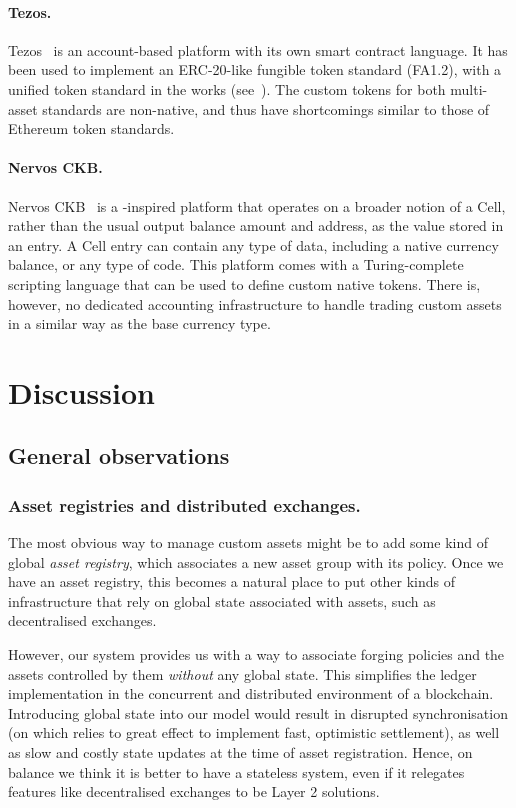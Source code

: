 \paragraph{Tezos.}

Tezos~\cite{tezos} is an account-based platform with its own smart contract language.
It has been used to implement an ERC-20-like fungible token standard (FA1.2),
with a unified token standard in the works (see~\cite{tezosMA}).
The custom tokens for both multi-asset standards are non-native, and thus have shortcomings
similar to those of Ethereum token standards.


\paragraph{Nervos CKB.}

Nervos CKB~\cite{nervos} is a \UTXO{}-inspired platform that operates on a broader notion of a Cell,
rather than the usual output balance amount and address, as the value stored in
an entry. A Cell entry can contain any type of data,
including a native currency balance, or any type of code.
This platform comes with a Turing-complete scripting language that can be used to define custom
native tokens. There is, however, no dedicated accounting infrastructure to handle
trading custom assets in a similar way as the base currency type.

\section{Discussion}
\label{sec:discussion}

\subsection{General observations}
\subsubsection{Asset registries and distributed exchanges.}

The most obvious way to manage custom assets might be to add some kind of global \emph{asset registry}, which associates a new asset group with its policy.
Once we have an asset registry, this becomes a natural place to put other kinds of infrastructure that rely on global state associated with assets, such as decentralised exchanges.

However, our system provides us with a way to associate forging policies and the assets controlled by them \emph{without} any global state. This simplifies the ledger implementation in the concurrent and distributed environment of a blockchain.
Introducing global state into our model would result in disrupted synchronisation (on which \cite{chakravarty2020hydra} relies to great effect to implement fast, optimistic settlement), as well as slow and costly state updates at the time of asset registration.
Hence, on balance we think it is better to have a stateless system, even if it relegates  features like decentralised exchanges to be Layer 2 solutions.

